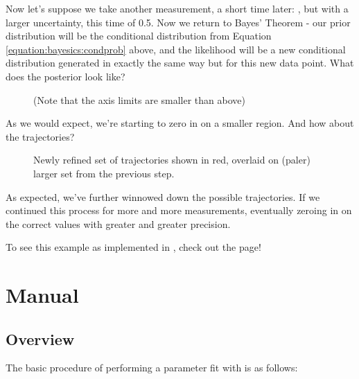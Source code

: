 \documentclass[letterpaper,10pt,english]{sphinxmanual}
\begin{document}
Now let’s suppose we take another measurement, a short time later: , but with a larger uncertainty, this time of 0.5. Now we return to Bayes’ Theorem - our prior distribution will be the conditional distribution from Equation \eqref{equation:bayesics:condprob} above, and the likelihood will be a new conditional distribution generated in exactly the same way but for this new data point. What does the posterior look like?

\begin{figure}[htbp]
\centering
\capstart

\noindent{}
\caption{(Note that the axis limits are smaller than above)}\label{\detokenize{bayesics:id5}}\end{figure}

As we would expect, we’re starting to zero in on a smaller region. And how about the trajectories?

\begin{figure}[htbp]
\centering
\capstart

\noindent{}
\caption{Newly refined set of trajectories shown in red, overlaid on (paler) larger set from the previous step.}\label{\detokenize{bayesics:id6}}\end{figure}

As expected, we’ve further winnowed down the possible trajectories. If we continued this process for more and more measurements, eventually zeroing in on the correct values with greater and greater precision.

To see this example as implemented in , check out the {\hyperref[\detokenize{examples::doc}]{}} page!


\chapter{Manual}
\label{\detokenize{manual:manual}}\label{\detokenize{manual::doc}}

\section{Overview}
\label{\detokenize{manual:overview}}
The basic procedure of performing a parameter fit with  is as follows:

\begin{figure}[htbp]
\centering

\noindent{}
\end{figure}
\end{document}

